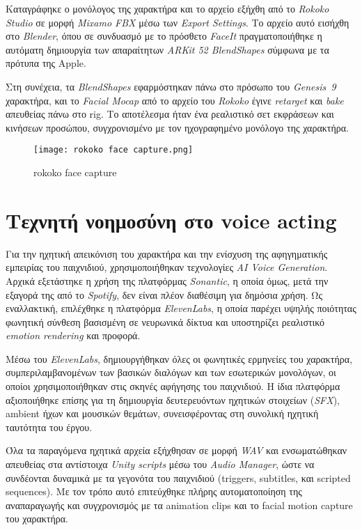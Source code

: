 Καταγράφηκε ο μονόλογος της χαρακτήρα και το αρχείο εξήχθη από το \textit{Rokoko Studio} 
σε μορφή \textit{Mixamo FBX} μέσω των \textit{Export Settings}. 
Το αρχείο αυτό εισήχθη στο \textit{Blender}, όπου σε συνδυασμό με το πρόσθετο 
\textit{FaceIt} πραγματοποιήθηκε η αυτόματη δημιουργία των απαραίτητων 
\textit{ARKit 52 BlendShapes} σύμφωνα με τα πρότυπα της Apple.

Στη συνέχεια, τα \textit{BlendShapes} εφαρμόστηκαν πάνω στο πρόσωπο του 
\textit{Genesis~9} χαρακτήρα, και το \textit{Facial Mocap} από το αρχείο του 
\textit{Rokoko} έγινε \textit{retarget} και \textit{bake} απευθείας πάνω στο rig. 
Το αποτέλεσμα ήταν ένα ρεαλιστικό σετ εκφράσεων και κινήσεων προσώπου, 
συγχρονισμένο με τον ηχογραφημένο μονόλογο της χαρακτήρα.

\begin{figure}[H]
    \centering
    \texttt{[image: rokoko face capture.png]}
    \caption{rokoko face capture}
    \label{fig:placeholder}
\end{figure}






\section{Τεχνητή νοημοσύνη στο voice acting}
Για την ηχητική απεικόνιση του χαρακτήρα και την ενίσχυση της αφηγηματικής εμπειρίας 
του παιχνιδιού, χρησιμοποιήθηκαν τεχνολογίες \textit{AI Voice Generation}. 
Αρχικά εξετάστηκε η χρήση της πλατφόρμας \textit{Sonantic}, η οποία όμως, 
μετά την εξαγορά της από το \textit{Spotify}, δεν είναι πλέον διαθέσιμη για δημόσια χρήση. 
Ως εναλλακτική, επιλέχθηκε η πλατφόρμα \textit{ElevenLabs}, 
η οποία παρέχει υψηλής ποιότητας φωνητική σύνθεση βασισμένη σε νευρωνικά δίκτυα 
και υποστηρίζει ρεαλιστικό \textit{emotion rendering} και προφορά.

Μέσω του \textit{ElevenLabs}, δημιουργήθηκαν όλες οι φωνητικές ερμηνείες 
του χαρακτήρα, συμπεριλαμβανομένων των βασικών διαλόγων και των εσωτερικών μονολόγων, 
οι οποίοι χρησιμοποιήθηκαν στις σκηνές αφήγησης του παιχνιδιού. 
Η ίδια πλατφόρμα αξιοποιήθηκε επίσης για τη δημιουργία δευτερευόντων 
ηχητικών στοιχείων (\textit{SFX}), ambient ήχων και μουσικών θεμάτων, 
συνεισφέροντας στη συνολική ηχητική ταυτότητα του έργου.

Όλα τα παραγόμενα ηχητικά αρχεία εξήχθησαν σε μορφή \textit{WAV} 
και ενσωματώθηκαν απευθείας στα αντίστοιχα \textit{Unity scripts} 
μέσω του \textit{Audio Manager}, ώστε να συνδέονται δυναμικά 
με τα γεγονότα του παιχνιδιού (triggers, subtitles, και scripted sequences). 
Με τον τρόπο αυτό επιτεύχθηκε πλήρης αυτοματοποίηση της αναπαραγωγής 
και συγχρονισμός με τα animation clips και το facial motion capture του χαρακτήρα.

